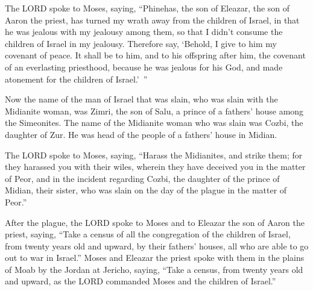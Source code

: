 \myverse{}The LORD spoke to Moses, saying,
\myverse{}“Phinehas, the son of Eleazar, the son of Aaron the priest, has turned my
wrath away from the children of Israel, in that he was jealous with my jealousy among them, so that I
didn’t consume the children of Israel in my jealousy.
\myverse{}Therefore say, ‘Behold, I give to him my covenant of peace.
\myverse{}It shall be to him, and to his offspring after him, the covenant of an everlasting
priesthood, because he was jealous for his God, and made atonement for the children of Israel.’ ”


\myverse{}Now the name of the man of Israel that was slain, who was slain
with the Midianite woman, was Zimri, the son of Salu, a prince of a fathers’ house among the Simeonites.
\myverse{}The name of the Midianite woman who was slain was Cozbi, the daughter of
Zur. He was head of the people of a fathers’ house in Midian.


\myverse{}The LORD spoke to Moses, saying,
\myverse{}“Harass the Midianites, and strike them;
\myverse{}for they harassed you with their wiles, wherein they have deceived you in
the matter of Peor, and in the incident regarding Cozbi, the daughter of the prince of Midian, their sister,
who was slain on the day of the plague in the matter of Peor.”


\mychapter{} \myverse*{}After the plague, the LORD spoke to Moses and to Eleazar the son
of Aaron the priest, saying,
\myverse{}“Take a census of all the congregation of the children of Israel, from twenty
years old and upward, by their fathers’ houses, all who are able to go out to war in Israel.”
\myverse{}Moses and Eleazar the priest spoke with them in the plains of Moab by the Jordan
at Jericho, saying,
\myverse{}“Take a census, from twenty years old and upward, as the LORD commanded Moses
and the children of Israel.”

